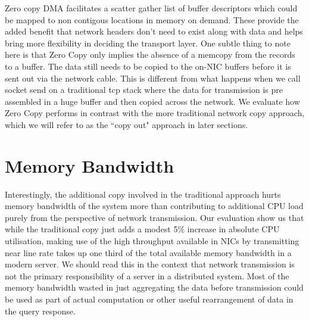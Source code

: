 Zero copy DMA facilitates a scatter gather list of buffer descriptors
which could be mapped to non contigous locations in memory on demand. These provide
the added benefit that network headers don't need to exist along with data and helps bring more flexibility 
in deciding the transport layer. One subtle thing to note here is that Zero Copy only implies the absence 
of a memcopy from the records to a buffer. The data still needs to be copied to the on-NIC buffers before 
it is sent out via the network cable. This is different from what happens when we call socket send on a traditional 
tcp stack where the data for transmission is pre assembled in a huge buffer and then copied across the network.
We evaluate how Zero Copy performs in contrast with the more traditional network copy approach, which we will refer
to as the ``copy out" approach in later sections.

\section{Memory Bandwidth}
Interestingly, the additional copy involved in the traditional approach hurts memory bandwidth of the system more than contributing 
to additional CPU load purely from the perspective of network transmission. Our evaluation show us that while the traditional
copy just adds a modest 5\% increase in absolute CPU utilisation, making use of the high throughput available in NICs by transmitting
near line rate takes up one third of the total available memory bandwidth in a modern server. We should read this in the context that 
network transmission is not the primary responsibility of a server in a distributed system. Most of the memory bandwidth wasted in 
just aggregating the data before transmission could be used as part of actual computation or other useful rearrangement of data in 
the query response.


